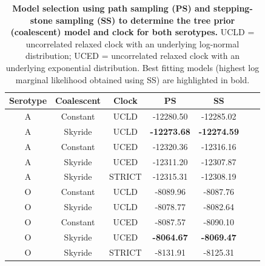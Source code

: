 \documentclass[a4paper,10pt]{article}
\begin{document}
\begin{table}[H]
\caption{\textbf{Model selection using path sampling (PS) and stepping-stone sampling (SS) to determine the tree prior (coalescent) model and clock for both serotypes.}
UCLD = uncorrelated relaxed clock with an underlying log-normal distribution; UCED = uncorrelated relaxed clock with an underlying exponential distribution.
Best fitting models (highest log marginal likelihood obtained using SS) are highlighted in bold.}
\begin{center}
\begin{tabular}{ccccccc}
\toprule
Serotype	&Coalescent	&Clock	& PS  & SS\\             
\midrule
A	&Constant	&UCLD	& -12280.50& -12285.02\\
A	&Skyride 	&UCLD	& \textbf{-12273.68} & \textbf{-12274.59}\\
A	&Constant	&UCED	& -12320.36 & -12316.16\\
A	&Skyride 	&UCED	& -12311.20 & -12307.87\\
A       &Skyride       &STRICT & -12315.31 & -12308.19\\
O	&Constant	&UCLD	& -8089.96& -8087.76\\
O	&Skyride 	&UCLD	& -8078.77 & -8082.64\\
O	&Constant	&UCED	&-8087.57 & -8090.10\\
O	&Skyride 	&UCED	& \textbf{-8064.67}& \textbf{-8069.47}\\
O       &Skyride       &STRICT & -8131.91& -8125.31\\
\bottomrule
\end{tabular}
\end{center}
\begin{flushleft}
\end{flushleft}
\label{stab:treeclockselection}
 \end{table}
\end{document}
